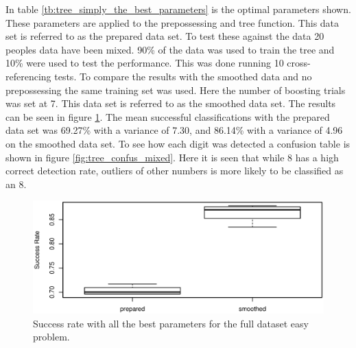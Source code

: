 In table \ref{tb:tree_simply_the_best_parameters} is the optimal parameters shown.
These parameters are applied to the prepossessing and tree function. 
This data set is referred to as the prepared data set.
To test these against the data 20 peoples data have been mixed.
90\% of the data was used to train the tree and 10\% were used to test the performance.
This was done running 10 cross-referencing tests. 
To compare the results with the smoothed data and no prepossessing the same training set was used.
Here the number of boosting trials was set at 7. 
This data set is referred to as the smoothed data set.
The results can be seen in figure \ref{fig:tree_performance_mixed}.
The mean successful classifications with the prepared data set was 69.27\% with a variance of 7.30, and 86.14\% with a variance of 4.96 on the smoothed data set.
To see how each digit was detected a confusion table is shown in figure \ref{fig:tree_confus_mixed}. 
Here it is seen that while 8 has a high correct detection rate, outliers of other numbers is more likely to be classified as an 8.

\begin{figure}[H]
\centering
\includegraphics[width=\textwidth]{graphics/tree_performance_mix_combined}
\caption[Success for decision tree on the easy problem.]{Success rate with all the best parameters for the full dataset easy problem.}
\label{fig:tree_performance_mixed}
\end{figure}

